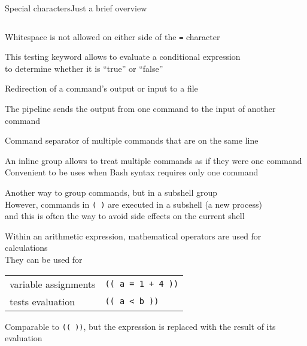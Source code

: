 \begin{frame}[fragile]{Special characters}{Just a brief overview}
\begin{columns}
\begin{column}{\dimexpr\paperwidth-10mm}
\begin{description}[\texttt{>  >>  <}]
                    Whitespace is not allowed on either side of the \texttt{=} character
                \item<only@2>[\texttt{[[ ]]}]
                    This \alert{testing keyword} allows to evaluate a conditional expression \\
                    to determine whether it is ``true'' or ``false''
                \item<only@2>[\texttt{>  >>  <}]
                    \alert{Redirection} of a command's output or input to a file
                \item<only@2>[\texttt{|}]
                    The \alert{pipeline} sends the output from one command to the input of another command
                \item<only@2>[\texttt{;}]
                    \alert{Command separator} of multiple commands that are on the same line
                \item<only@2>[\texttt{\{ \}}]
                    An \alert{inline group} allows to treat multiple commands as if they were one command
                    Convenient to be uses when Bash syntax requires only one command
                \item<only@2>[\texttt{( )}]
                    Another way to group commands, but in a \alert{subshell group} \\
                    However, commands in \texttt{( )} are executed in a subshell (a new process) \\
                    and this is often the way to avoid side effects on the current shell
                \item<only@3-4>[\texttt{(( ))}]
                     Within an \alert{arithmetic expression}, mathematical operators are used for calculations \\
                     They can be used for\\
                     \begin{tabular}{ll}
                        \PB{$\bullet\;$} variable assignments   & \texttt{(( a = 1 + 4 ))}  \\
                        \PB{$\bullet\;$} tests evaluation       & \texttt{(( a < b ))}      \\
                    \end{tabular}
                \item<only@3-4>[\texttt{\$(( ))}]
                    Comparable to \texttt{(( ))}, but the expression is replaced with the result of its evaluation

\end{description}
\end{column}
\end{columns}
\end{frame}
